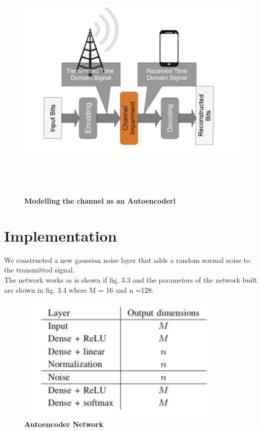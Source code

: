 \begin{figure}[H]
  \centering
    \includegraphics[height= 12cm, width=18cm]{project/images/encoder-decoder.png}
  \caption{\textbf{Modelling the channel as an Autoencoderl}}
\end{figure}

\newpage
\section{Implementation}
We constructed a new gaussian noise layer that adds a random normal noise to the transmitted signal. \\
The network works as is shown if fig. 3.3 and the parameters of the network built are shown in fig. 3.4 where M = 16 and n =128. 

\begin{figure}[H]
  \centering
    \includegraphics[height= 6cm, width=10cm]{project/images/network.png}
  \caption{\textbf{Autoencoder Network}}
\end{figure}

